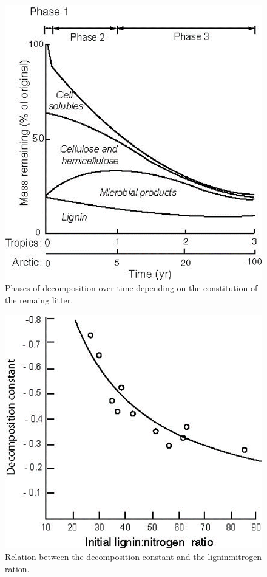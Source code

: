 \documentclass[
  12pt,
  oneside]{book}
\begin{document}
\begin{figure}

{\centering \includegraphics[width=0.8\linewidth]{figures/chap5/f515_decomp_phases} 

}

\caption{Phases of decomposition over time depending on the constitution of the remaing litter.}\label{fig:f515}
\end{figure}

\begin{figure}

{\centering \includegraphics[width=0.8\linewidth]{figures/chap5/f516_decay_lignin} 

}

\caption{Relation between the decomposition constant and the lignin:nitrogen ration.}\label{fig:f516}
\end{figure}
\end{document}
